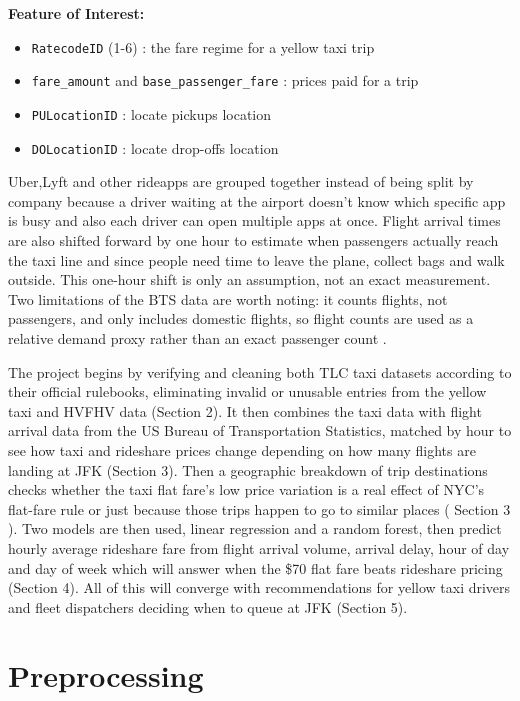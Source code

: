 \documentclass[11pt]{article}
\begin{document}
\textbf{Feature of Interest:}
\begin{itemize}
  \item \texttt{RatecodeID} (1-6) : the fare regime for a yellow taxi trip
  \item \texttt{fare\_amount} and \texttt{base\_passenger\_fare} : prices paid for a trip
  \item \texttt{PULocationID} : locate pickups location
  \item \texttt{DOLocationID} : locate drop-offs location
\end{itemize}

Uber,Lyft and other rideapps are grouped together instead of being split by company
because a driver waiting at the airport doesn't know which specific app is busy and
also each driver can open multiple apps at once. Flight arrival times are also
shifted forward by one hour to estimate when passengers actually reach the taxi line
and since people need time to leave the plane, collect bags and walk outside. This
one-hour shift is only an assumption, not an exact measurement. Two limitations of
the BTS data are worth noting: it counts flights, not passengers, and only includes
domestic flights, so flight counts are used as a relative demand proxy rather than
an exact passenger count \citep{bts-ontime}.

The project begins by verifying and cleaning both TLC taxi datasets according to
their official rulebooks, eliminating invalid or unusable entries from the yellow
taxi and HVFHV data (Section 2). It then combines the taxi data with flight arrival
data from the US Bureau of Transportation Statistics, matched by hour to see how taxi
and rideshare prices change depending on how many flights are landing at JFK (Section
3). Then a geographic breakdown of trip destinations checks whether the taxi flat
fare's low price variation is a real effect of NYC's flat-fare rule or just because
those trips happen to go to similar places ( Section 3 ). Two models are then used,
linear regression and a random forest, then predict hourly average rideshare fare from
flight arrival volume, arrival delay, hour of day and day of week which will answer
when the \$70 flat fare beats rideshare pricing (Section 4). All of this will converge
with recommendations for yellow taxi drivers and fleet dispatchers deciding when to
queue at JFK (Section 5).

\section{Preprocessing}
\end{document}
